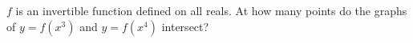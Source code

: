 $f$ is an invertible function defined on all reals. At how many points do the graphs of $y=f(x^3)$ and $y=f(x^4)$ intersect?
